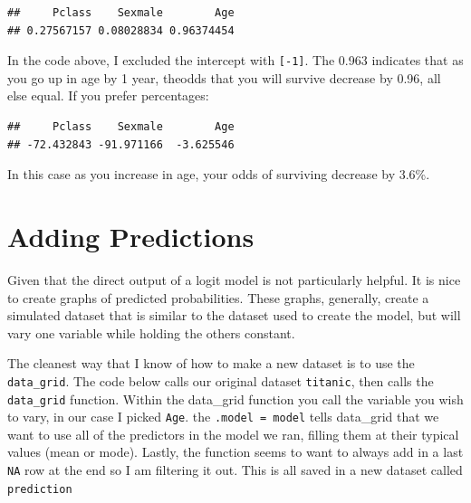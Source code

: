 \documentclass[]{book}
\newenvironment{Shaded}{\begin{snugshade}}{\end{snugshade}}
\newcommand{\KeywordTok}[1]{\textcolor[rgb]{0.13,0.29,0.53}{\textbf{#1}}}
\newcommand{\DataTypeTok}[1]{\textcolor[rgb]{0.13,0.29,0.53}{#1}}
\newcommand{\DecValTok}[1]{\textcolor[rgb]{0.00,0.00,0.81}{#1}}
\newcommand{\StringTok}[1]{\textcolor[rgb]{0.31,0.60,0.02}{#1}}
\newcommand{\OperatorTok}[1]{\textcolor[rgb]{0.81,0.36,0.00}{\textbf{#1}}}
\newcommand{\NormalTok}[1]{#1}
\begin{document}
\begin{verbatim}
##     Pclass    Sexmale        Age 
## 0.27567157 0.08028834 0.96374454
\end{verbatim}

In the code above, I excluded the intercept with \texttt{{[}-1{]}}. The
0.963 indicates that as you go up in age by 1 year, theodds that you
will survive decrease by 0.96, all else equal. If you prefer
percentages:

\begin{Shaded}
\end{Shaded}

\begin{verbatim}
##     Pclass    Sexmale        Age 
## -72.432843 -91.971166  -3.625546
\end{verbatim}

In this case as you increase in age, your odds of surviving decrease by
3.6\%.

\section{Adding Predictions}\label{adding-predictions}

Given that the direct output of a logit model is not particularly
helpful. It is nice to create graphs of predicted probabilities. These
graphs, generally, create a simulated dataset that is similar to the
dataset used to create the model, but will vary one variable while
holding the others constant.

The cleanest way that I know of how to make a new dataset is to use the
\texttt{data\_grid}. The code below calls our original dataset
\texttt{titanic}, then calls the \texttt{data\_grid} function. Within
the data\_grid function you call the variable you wish to vary, in our
case I picked \texttt{Age}. the \texttt{.model\ =\ model} tells
data\_grid that we want to use all of the predictors in the model we
ran, filling them at their typical values (mean or mode). Lastly, the
function seems to want to always add in a last \texttt{NA} row at the
end so I am filtering it out. This is all saved in a new dataset called
\texttt{prediction}

\begin{Shaded}
\end{Shaded}
\end{document}
